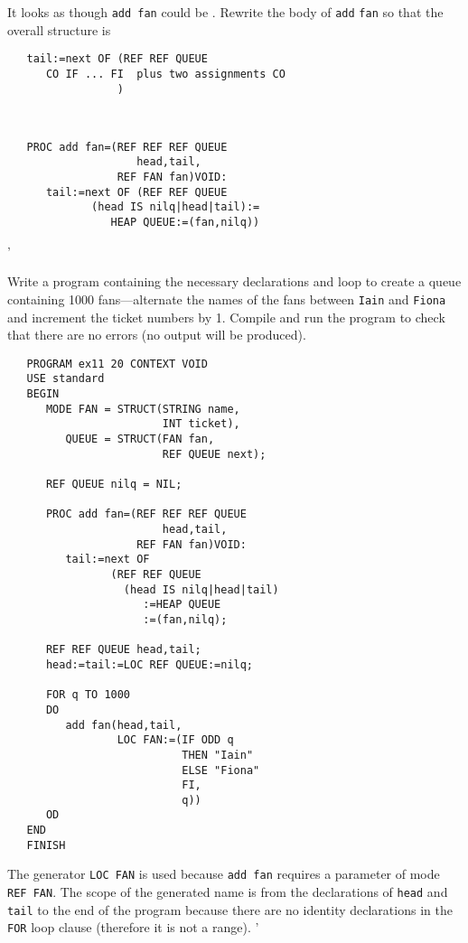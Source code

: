 \begin{exercise}
\item It looks as though \verb|add fan| could be
. Re\-write the body of \verb|add|
\verb|fan| so that the overall structure is
\begin{verbatim}
   tail:=next OF (REF REF QUEUE
      CO IF ... FI  plus two assignments CO
                 )
\end{verbatim}
\indent \ans \ %
\begin{verbatim}
   PROC add fan=(REF REF REF QUEUE
                    head,tail,
                 REF FAN fan)VOID:
      tail:=next OF (REF REF QUEUE
             (head IS nilq|head|tail):=
                HEAP QUEUE:=(fan,nilq))
\end{verbatim}
'
\item Write a program containing the necessary declarations and loop to
create a queue containing 1000 fans---alternate the names of the fans
between \verb|Iain| and \verb|Fiona| and increment the ticket
numbers by 1. Compile and run the program to check that there are no
errors (no output will be produced). \ans \ %
\begin{verbatim}
   PROGRAM ex11 20 CONTEXT VOID
   USE standard
   BEGIN
      MODE FAN = STRUCT(STRING name,
                        INT ticket),
         QUEUE = STRUCT(FAN fan,
                        REF QUEUE next);

      REF QUEUE nilq = NIL;

      PROC add fan=(REF REF REF QUEUE
                        head,tail,
                    REF FAN fan)VOID:
         tail:=next OF
                (REF REF QUEUE
                  (head IS nilq|head|tail)
                     :=HEAP QUEUE
                     :=(fan,nilq);

      REF REF QUEUE head,tail;
      head:=tail:=LOC REF QUEUE:=nilq;

      FOR q TO 1000
      DO
         add fan(head,tail,
                 LOC FAN:=(IF ODD q
                           THEN "Iain"
                           ELSE "Fiona"
                           FI,
                           q))
      OD
   END
   FINISH
\end{verbatim}
\noindent The generator \verb|LOC FAN| is used because \verb|add fan|
requires a parameter of mode \verb|REF FAN|. The scope of the
generated name is from the declarations of \verb|head| and
\verb|tail| to the end of the program because there are no identity
declarations in the \verb|FOR| loop clause (therefore it is not a
range).
'
\end{exercise}

